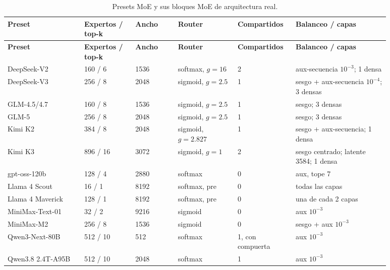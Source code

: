 {\small
\begin{longtable}{@{}L{0.18\linewidth}L{0.12\linewidth}L{0.10\linewidth}L{0.14\linewidth}L{0.12\linewidth}L{0.22\linewidth}@{}}
\caption{Presets MoE y sus bloques MoE de arquitectura real.}\label{tab:moe-presets-es}\\
\toprule
\textbf{Preset} & \textbf{Expertos / top-k} & \textbf{Ancho} & \textbf{Router} & \textbf{Compartidos} & \textbf{Balanceo / capas} \\
\midrule
\endfirsthead
\toprule
\textbf{Preset} & \textbf{Expertos / top-k} & \textbf{Ancho} & \textbf{Router} & \textbf{Compartidos} & \textbf{Balanceo / capas} \\
\midrule
\endhead
DeepSeek-V2 & 160 / 6 & 1536 & softmax, $g{=}16$ & 2 & aux-secuencia $10^{-3}$; 1 densa \\
DeepSeek-V3 & 256 / 8 & 2048 & sigmoid, $g{=}2.5$ & 1 & sesgo + aux-secuencia $10^{-4}$; 3 densas \\
GLM-4.5/4.7 & 160 / 8 & 1536 & sigmoid, $g{=}2.5$ & 1 & sesgo; 3 densas \\
GLM-5 & 256 / 8 & 2048 & sigmoid, $g{=}2.5$ & 1 & sesgo; 3 densas \\
Kimi K2 & 384 / 8 & 2048 & sigmoid, $g{=}2.827$ & 1 & sesgo + aux-secuencia; 1 densa \\
Kimi K3 & 896 / 16 & 3072 & sigmoid, $g{=}1$ & 2 & sesgo centrado; latente 3584; 1 densa \\
gpt-oss-120b & 128 / 4 & 2880 & softmax & 0 & aux, tope 7 \\
Llama 4 Scout & 16 / 1 & 8192 & softmax, pre & 0 & todas las capas \\
Llama 4 Maverick & 128 / 1 & 8192 & softmax, pre & 0 & una de cada 2 capas \\
MiniMax-Text-01 & 32 / 2 & 9216 & sigmoid & 0 & aux $10^{-3}$ \\
MiniMax-M2 & 256 / 8 & 1536 & sigmoid & 0 & sesgo + aux $10^{-3}$ \\
Qwen3-Next-80B & 512 / 10 & 512 & softmax & 1, con compuerta & aux $10^{-3}$ \\
Qwen3.8 2.4T-A95B & 512 / 10 & 2048 & softmax & 1 & aux $10^{-3}$ \\
\bottomrule
\end{longtable}
}

